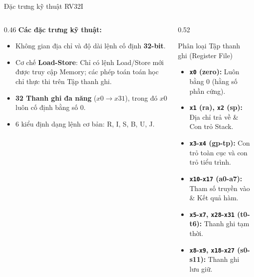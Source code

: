 \begin{frame}{Đặc trưng kỹ thuật RV32I}
    \begin{columns}
        \begin{column}{0.46\textwidth}
            \textbf{Các đặc trưng kỹ thuật:}
            \begin{itemize}
                \item Không gian địa chỉ và độ dài lệnh cố định \textbf{32-bit}.
                \item Cơ chế \textbf{Load-Store}: Chỉ có lệnh Load/Store mới được truy cập Memory; các phép toán toán học chỉ thực thi trên Tập thanh ghi.
                \item \textbf{32 Thanh ghi đa năng} ($x0 \rightarrow x31$), trong đó $x0$ luôn cố định bằng số $0$.
                \item 6 kiểu định dạng lệnh cơ bản: R, I, S, B, U, J.
            \end{itemize}
        \end{column}
        
        \begin{column}{0.52\textwidth}
            \begin{exampleblock}{Phân loại Tập thanh ghi (Register File)}
                \scriptsize
                \begin{itemize}
                    \item \textcolor{red!80!black}{\textbf{\texttt{x0} (zero):}} Luôn bằng 0 (hằng số phần cứng).
                    \item \textcolor{blue!80!black}{\textbf{\texttt{x1} (ra), \texttt{x2} (sp):}} Địa chỉ trả về \& Con trỏ Stack.
                    \item \textcolor{blue!60!black}{\textbf{\texttt{x3}-\texttt{x4} (gp-tp):}} Con trỏ toàn cục và con trỏ tiểu trình.
                    \item \textcolor{orange!80!black}{\textbf{\texttt{x10}-\texttt{x17} (a0-a7):}} Tham số truyền vào \& Kết quả hàm.
                    \item \textcolor{green!60!black}{\textbf{\texttt{x5}-\texttt{x7}, \texttt{x28}-\texttt{x31} (t0-t6):}} Thanh ghi tạm thời.
                    \item \textcolor{purple!80!black}{\textbf{\texttt{x8}-\texttt{x9}, \texttt{x18}-\texttt{x27} (s0-s11):}} Thanh ghi lưu giữ.
                \end{itemize}
            \end{exampleblock}
        \end{column}
    \end{columns}
\end{frame}

